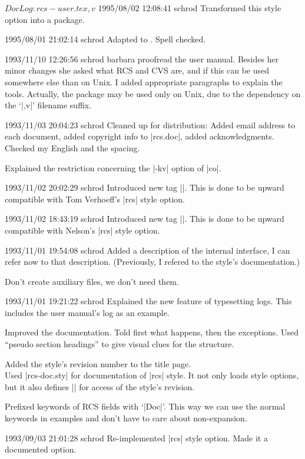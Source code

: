 \begin{rcslog}
$DocLog: rcs-user.tex,v $
 1995/08/02 12:08:41 schrod
Transformed this style option into a \LaTeXe{} package.

 1995/08/01 21:02:14 schrod
Adapted to \LaTeXe{}. Spell checked.

 1993/11/10 12:26:56 schrod
barbara proofread the user manual. Besides her minor changes she
asked what RCS and CVS are, and if this can be used somewhere else
than on Unix. I added appropriate paragraphs to explain the tools.
Actually, the package may be used only on Unix, due to the dependency
on the `|,v|' filename suffix.

 1993/11/03 20:04:23 schrod
Cleaned up for distribution: Added email address to each document,
added copyright info to |rcs.doc|, added acknowledgments. Checked my
English and the spacing.

Explained the restriction concerning the |-kv| option of |co|.

 1993/11/02 20:02:29 schrod
Introduced new tag |\RCSdef|. This is done to be upward compatible with
Tom Verhoeff's |rcs| style option.

 1993/11/02 18:43:19 schrod
Introduced new tag |\RCSID|. This is done to be upward compatible with
Nelson's |rcs| style option.

 1993/11/01 19:54:08 schrod
Added a description of the internal interface, I can refer now to
that description. (Previously, I refered to the style's documentation.)

Don't create auxiliary files, we don't need them.

 1993/11/01 19:21:22 schrod
Explained the new feature of typesetting logs. This includes the user
manual's log as an example.

Improved the documentation. Told first what happens, then the
exceptions. Used ``pseudo section headings'' to give visual clues for
the structure.

Added the style's revision number to the title page.\\
 Used |rcs-doc.sty| for documentation of |rcs| style. It not only
loads style options, but it also defines |\RCSStyleRevision| for
access of the style's revision.

Prefixed keywords of RCS fields with `|Doc|'. This way we can use the
normal keywords in examples and don't have to care about
non-expansion.

  1993/09/03  21:01:28  schrod
Re-implemented |rcs| style option. Made it a documented option.

\end{rcslog}


